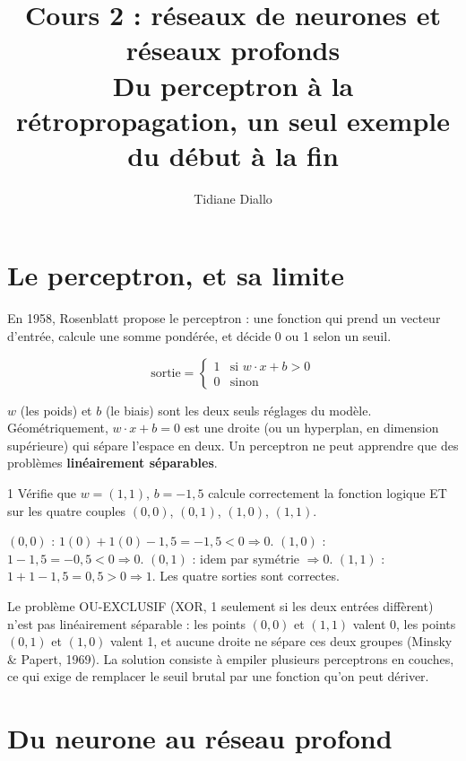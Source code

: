 \documentclass[11pt]{article}
\title{Cours 2 : réseaux de neurones et réseaux profonds\\[0.3em]\large Du perceptron à la rétropropagation, un seul exemple du début à la fin}
\author{Tidiane Diallo}
\date{}
\begin{document}
\maketitle
\tableofcontents

\section{Le perceptron, et sa limite}

En 1958, Rosenblatt propose le perceptron : une fonction qui prend un vecteur d'entrée, calcule une somme pondérée, et décide 0 ou 1 selon un seuil.

\[ \text{sortie} = \begin{cases} 1 & \text{si } w \cdot x + b > 0 \\ 0 & \text{sinon} \end{cases} \]

$w$ (les poids) et $b$ (le biais) sont les deux seuls réglages du modèle. Géométriquement, $w\cdot x + b = 0$ est une droite (ou un hyperplan, en dimension supérieure) qui sépare l'espace en deux. Un perceptron ne peut apprendre que des problèmes \textbf{linéairement séparables}.

\begin{exo}{1}
Vérifie que $w=(1,1)$, $b=-1{,}5$ calcule correctement la fonction logique ET sur les quatre couples $(0,0)$, $(0,1)$, $(1,0)$, $(1,1)$.
\end{exo}
\begin{sol}
$(0,0)$ : $1(0)+1(0)-1{,}5=-1{,}5<0 \Rightarrow 0$. $(1,0)$ : $1-1{,}5=-0{,}5<0 \Rightarrow 0$. $(0,1)$ : idem par symétrie $\Rightarrow 0$. $(1,1)$ : $1+1-1{,}5=0{,}5>0 \Rightarrow 1$. Les quatre sorties sont correctes.
\end{sol}

\begin{remarque}
Le problème OU-EXCLUSIF (XOR, 1 seulement si les deux entrées diffèrent) n'est pas linéairement séparable : les points $(0,0)$ et $(1,1)$ valent 0, les points $(0,1)$ et $(1,0)$ valent 1, et aucune droite ne sépare ces deux groupes (Minsky \& Papert, 1969). La solution consiste à empiler plusieurs perceptrons en couches, ce qui exige de remplacer le seuil brutal par une fonction qu'on peut dériver.
\end{remarque}

\section{Du neurone au réseau profond}
\end{document}
